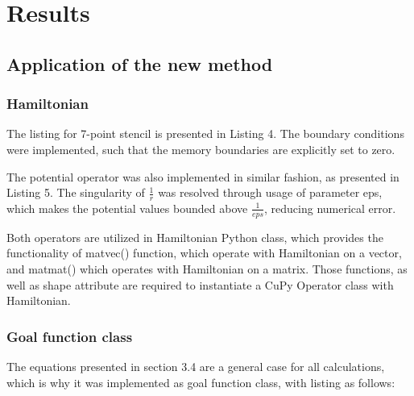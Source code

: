 \section{Results}

\subsection{Application of the new method}

\subsubsection{Hamiltonian}

 The listing for 7-point stencil is presented in Listing 4. The boundary conditions were implemented, such that the memory boundaries are explicitly set to zero.

\vspace{0.2cm}


The potential operator was also implemented in similar fashion, as presented in Listing 5. The singularity of $\frac{1}{r}$ was resolved through usage of parameter eps, which makes the potential values bounded above $\frac{1}{eps}$, reducing numerical error.

\vspace{0.2cm}


Both operators are utilized in Hamiltonian Python class, which provides the functionality of matvec() function, which operate with Hamiltonian on a vector, and matmat() which operates with Hamiltonian on a matrix. Those functions, as well as shape attribute are required to instantiate a CuPy Operator class with Hamiltonian.

\vspace{0.2cm}



\subsubsection{Goal function class}

The equations presented in section 3.4 are a general case for all calculations, which is why it was implemented as goal function class, with listing as follows:

